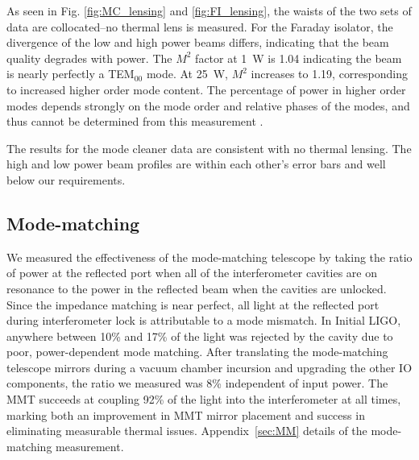 As seen in Fig. \ref{fig:MC_lensing} and \ref{fig:FI_lensing}, the
waists of the two sets of data are collocated--no thermal lens is
measured. For the Faraday isolator, the divergence of the low and high
power beams differs, indicating that the beam quality degrades with
power. The $M^2$ factor at 1~W is 1.04 indicating the beam is 
nearly perfectly a TEM$_{00}$ mode. At 25~W, $M^2$ increases to 1.19,
corresponding to increased higher order mode content. The percentage
of power in higher order modes depends strongly on the mode order and
relative phases of the modes, and thus cannot be determined from this
measurement \citep{Kwee2007Laser}.

The results for the mode cleaner data are consistent with no thermal
lensing. The high and low power beam profiles are within each
other's error bars and well below our requirements. 




\subsection{Mode-matching}
We measured the effectiveness of the mode-matching telescope by taking
the ratio of power at the reflected port when all of the
interferometer cavities are on resonance to the power in the reflected
beam when the cavities are unlocked. Since the impedance matching is
near perfect, all light at the reflected port during interferometer
lock is attributable to a mode mismatch. In Initial LIGO, anywhere
between 10\% and 17\% of the light was rejected by the cavity due to
poor, power-dependent mode matching.  After translating the
mode-matching telescope mirrors during a vacuum chamber incursion and
upgrading the other IO components, the ratio we measured was 8\%
independent of input power. The MMT succeeds at coupling 92\% of the
light into the interferometer at all times, marking both an
improvement in MMT mirror placement and success in eliminating
measurable thermal issues. Appendix~\ref{sec:MM} details of the
mode-matching measurement.


